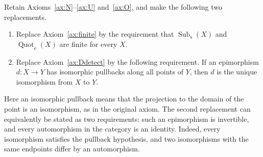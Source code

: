 \documentclass[11pt,a4paper]{article}
\theoremstyle{plain}
\theoremstyle{definition}
\theoremstyle{remark}
\begin{document}
Retain Axioms~\ref{ax:N}--\ref{ax:U} and~\ref{ax:O}, and make
the following two replacements.
\begin{enumerate}
\item Replace Axiom~\ref{ax:finite} by the requirement that
$\operatorname{Sub}_{\mathrm{s}}(X)$ and
$\operatorname{Quot}_{\mathrm{e}}(X)$ are finite for every $X$.
\item Replace Axiom~\ref{ax:Ddetect} by the following requirement.
If an epimorphism $d:X\to Y$ has isomorphic pullbacks along
all points of $Y$, then $d$ is the unique isomorphism from
$X$ to $Y$.
\end{enumerate}
Here an isomorphic pullback means that the projection to the
domain of the point is an isomorphism, as in the original
axiom. The second replacement can equivalently be stated as
two requirements: such an epimorphism is invertible, and every
automorphism in the category is an identity. Indeed, every
isomorphism satisfies the pullback hypothesis, and two
isomorphisms with the same endpoints differ by an automorphism.
\end{document}

